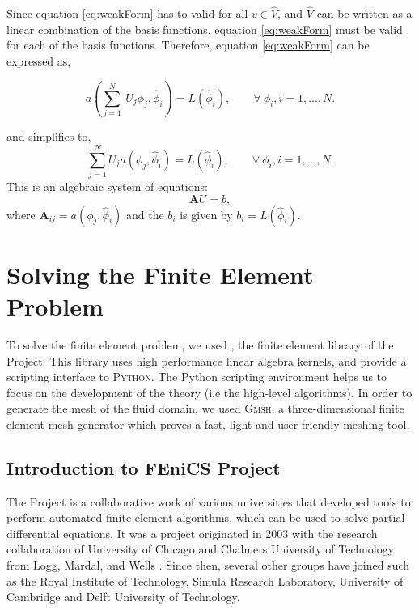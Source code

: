 Since equation \ref{eq:weakForm} has to valid for all $v \in \hat{V}$, and $\hat{V}$ can be written as a linear combination of the basis functions, equation \ref{eq:weakForm} must be valid for each of the basis functions. Therefore, equation \ref{eq:weakForm} can be expressed as, 

	\begin{equation}
	a(\sum_{j=1}^N \ U_j \phi_j,\hat{\phi}_i) = L(\hat{\phi}_i), \qquad \forall\ \phi_i, i = 1,...,N.
	\end{equation}

and simplifies to,	
	\begin{equation}
	\sum_{j=1}^N U_j a(\phi_j,\hat{\phi}_i) = L(\hat{\phi}_i), \qquad \forall\ \phi_i, i = 1,...,N.
	\end{equation}
This is an algebraic system of equations:
	\begin{equation}
	\mathbf{A}U = b,
	\label{eq:linearSysOfEq}
	\end{equation}	
where $\mathbf{A}_{ij} = a(\phi_j,\hat{\phi}_i)$ and the  $b_i$ is given by $b_i=L(\hat{\phi}_i)$.
 	
\section{Solving the Finite Element Problem}
\label{sec:e-stfep}

To solve the finite element problem, we used \dolfin, the finite element library of the \fenics Project. This library uses high performance linear algebra kernels, and provide a scripting interface to \textsc{Python}. The Python scripting environment helps us to focus on the development of the theory (i.e the high-level algorithms). In order to generate the mesh of the fluid domain, we used \textsc{Gmsh}, a three-dimensional finite element mesh generator which proves a fast, light and user-friendly meshing tool.

\subsection{Introduction to FEniCS Project}

The \fenics Project is a collaborative work of various universities that developed tools to perform automated finite element algorithms, which can be used to solve partial differential equations. It was a project originated in 2003 with the research collaboration of University of Chicago and Chalmers University of Technology from Logg,  Mardal, and Wells \cite{Logg2012b}. Since then, several other groups have joined such as the Royal Institute of Technology, Simula Research Laboratory, University of Cambridge and Delft University of Technology.

